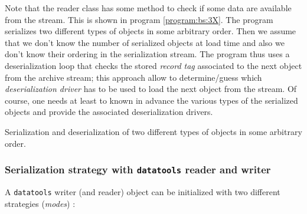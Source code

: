 \documentclass[a4paper,12pt]{article}
\newcommand{\basepath}{.}
\newcommand{\codingpath}{\basepath/coding}
\newcommand{\pn}{\par\noindent}
\begin{document}
\pn Note that  the reader class has some method to  check if some data
are   available  from   the  stream.    This  is   shown   in  program
\ref{program:bs:3X}.   The program serializes  two different  types of
objects in  some arbitrary order.  Then  we assume that  we don't know
the number of  serialized objects at load time and  also we don't know
their ordering in  the serialization stream.  The program  thus uses a
deserialization  loop   that  checks  the   stored  \emph{record  tag}
associated to the  next object from the archive  stream; this approach
allow to determine/guess which \emph{deserialization driver} has to be
used to load the next object from the stream.  Of course, one needs at
least to known in advance  the various types of the serialized objects
and provide the associated deserialization drivers.

\begin{program}[h]
\VerbatimInput[frame=single,
numbers=left,
numbersep=2pt,
firstline=1,
fontsize=\footnotesize,
showspaces=false]{\codingpath/data_3X.cxx}
\caption{Serialization and deserialization of two different  types of
objects in some arbitrary order.
}
\label{program:bs:3X}
\end{program}

\subsubsection{Serialization strategy with \texttt{datatools} reader and writer}

\pn A \texttt{datatools} writer (and reader) object can be initialized with two different
strategies (\emph{modes}) :
\end{document}
